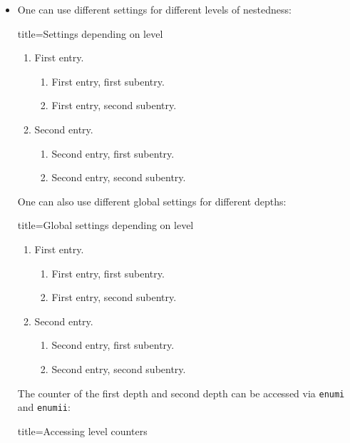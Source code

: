 \begin{itemize}
  \item
    One can use different settings for different levels of nestedness:
    \begin{tcblisting}{title={Settings depending on level}}
\begin{enumerate}[label = \Roman*]
  \item
    First entry.
    \begin{enumerate}[label = \alph*]
      \item
        First entry, first subentry.
      \item
        First entry, second subentry.
    \end{enumerate}
  \item
    Second entry.
    \begin{enumerate}[label = \arabic*]
      \item
        Second entry, first subentry.
      \item
        Second entry, second subentry.
    \end{enumerate}
\end{enumerate}
    \end{tcblisting}
    One can also use different global settings for different depths:
    \begin{tcblisting}{title={Global settings depending on level}}
\begin{enumerate}
  \item
    First entry.
    \begin{enumerate}
      \item
        First entry, first subentry.
      \item
        First entry, second subentry.
    \end{enumerate}
  \item
    Second entry.
    \begin{enumerate}
      \item
        Second entry, first subentry.
      \item
        Second entry, second subentry.
    \end{enumerate}
\end{enumerate}
    \end{tcblisting}
    The counter of the first depth and second depth can be accessed via \texttt{enumi} and \texttt{enumii}: 
    \begin{tcblisting}{title={Accessing level counters}}

\end{tcblisting}
\end{itemize}
